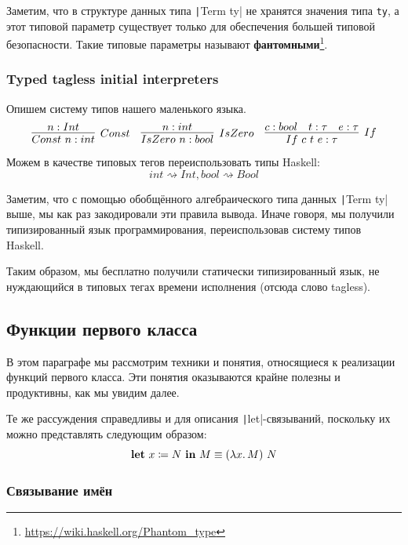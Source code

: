 \documentclass[12pt]{article}
\newcommand{\vocab}[1]{\textbf{#1}} %
\newcommand{\term}[1]{\mathbf{#1}}
\newcommand{\ap}{~}
\newcommand{\termdef}{\coloneqq}
\begin{document}
    Заметим, что в структуре данных типа \texttt|Term ty| не хранятся значения типа \texttt{ty}, а этот типовой параметр существует только для обеспечения большей типовой безопасности.
    Такие типовые параметры называют \vocab{фантомными}\footnote{\url{https://wiki.haskell.org/Phantom_type}}.

    \subsubsection{Typed tagless initial interpreters}

    Опишем систему типов нашего маленького языка.
    \begin{equation*}{}
        \infer[Const]{Const~n : int}{n : Int}
        \quad
        \infer[IsZero]{IsZero~n : bool}{n : int}
        \quad
        \infer[If]{If~c~t~e : \tau}{c : bool & t : \tau & e : \tau}
    \end{equation*}
    Можем в качестве типовых тегов переиспользовать типы Haskell: \[int \rightsquigarrow Int, bool \rightsquigarrow Bool\]

    Заметим, что с помощью обобщённого алгебраического типа данных \texttt|Term ty| выше, мы как раз закодировали эти правила вывода.
    Иначе говоря, мы получили типизированный язык программирования, переиспользовав систему типов Haskell.

    Таким образом, мы бесплатно получили статически типизированный язык, не нуждающийся в типовых тегах времени исполнения (отсюда слово tagless).

    \subsection{Функции первого класса} \label{subsec:first-class-functions}

    В этом параграфе мы рассмотрим техники и понятия, относящиеся к реализации функций первого класса.
    Эти понятия оказываются крайне полезны и продуктивны, как мы увидим далее.

    Те же рассуждения справедливы и для описания \texttt|let|-связываний, поскольку их можно представлять следующим образом:
    \[
        \term{let} \ap x \termdef N \ap \term{in} \ap M \equiv (\lambda x\ldotp M) \ap N
    \]

    \subsubsection{Связывание имён}
\end{document}
